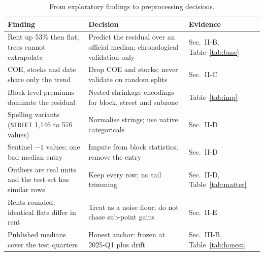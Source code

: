 \documentclass[conference]{IEEEtran}
\begin{document}
\begin{table}[t]
\caption{From exploratory findings to preprocessing decisions.}\label{tab:eda2prep}
\centering\footnotesize
\begin{tabular}{@{}p{5.9cm}p{5.9cm}p{3.6cm}@{}}
\toprule
Finding & Decision & Evidence\\
\midrule
Rent up 53\% then flat; trees cannot extrapolate & Predict the residual over an official median; chronological validation only & Sec.~II-B, Table~\ref{tab:base}\\
COE, stocks and date share only the trend & Drop COE and stocks; never validate on random splits & Sec.~II-C\\
Block-level premiums dominate the residual & Nested shrinkage encodings for block, street and subzone & Table~\ref{tab:imp}\\
Spelling variants (\texttt{STREET} 1,146 to 576 values) & Normalise strings; use native categoricals & Sec.~II-D\\
Sentinel $-1$ values; one bad median entry & Impute from block statistics; remove the entry & Sec.~II-D\\
Outliers are real units and the test set has similar rows & Keep every row; no tail trimming & Sec.~II-D, Table~\ref{tab:matter}\\
Rents rounded; identical flats differ in rent & Treat as a noise floor; do not chase sub-point gains & Sec.~II-E\\
Published medians cover the test quarters & Honest anchor: frozen at 2025-Q1 plus drift & Sec.~III-B, Table~\ref{tab:honest}\\
\bottomrule
\end{tabular}
\end{table}
\end{document}
